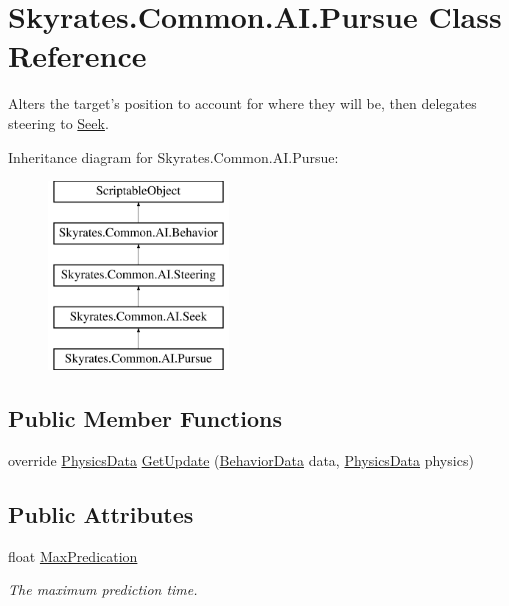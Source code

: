\hypertarget{class_skyrates_1_1_common_1_1_a_i_1_1_pursue}{\section{Skyrates.\-Common.\-A\-I.\-Pursue Class Reference}
\label{class_skyrates_1_1_common_1_1_a_i_1_1_pursue}
}


Alters the target's position to account for where they will be, then delegates steering to \hyperlink{class_skyrates_1_1_common_1_1_a_i_1_1_seek}{Seek}.  


Inheritance diagram for Skyrates.\-Common.\-A\-I.\-Pursue\-:\begin{figure}[H]
\begin{center}
\leavevmode
\includegraphics[height=5.000000cm]{class_skyrates_1_1_common_1_1_a_i_1_1_pursue}
\end{center}
\end{figure}
\subsection*{Public Member Functions}
\begin{DoxyCompactItemize}
\item 
override \hyperlink{class_skyrates_1_1_common_1_1_a_i_1_1_physics_data}{Physics\-Data} \hyperlink{class_skyrates_1_1_common_1_1_a_i_1_1_pursue_ab504e85e4e66a580205dd71c74df030d}{Get\-Update} (\hyperlink{class_skyrates_1_1_common_1_1_a_i_1_1_behavior_data}{Behavior\-Data} data, \hyperlink{class_skyrates_1_1_common_1_1_a_i_1_1_physics_data}{Physics\-Data} physics)
\end{DoxyCompactItemize}
\subsection*{Public Attributes}
\begin{DoxyCompactItemize}
\item 
float \hyperlink{class_skyrates_1_1_common_1_1_a_i_1_1_pursue_aaceb63cfe207670141eeda4fe06ca724}{Max\-Predication}
\begin{DoxyCompactList}\small\item\em The maximum prediction time. \end{DoxyCompactList}\end{DoxyCompactItemize}


